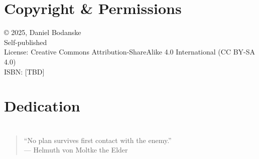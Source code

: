 \cleardoublepage
\chapter*{Copyright \& Permissions}
© 2025, Daniel Bodanske\\
Self-published\\
License: Creative Commons Attribution-ShareAlike 4.0 International (CC BY-SA 4.0)\\
ISBN: [TBD]
\clearpage

\cleardoublepage
\chapter*{Dedication}
\clearpage

\cleardoublepage
\chapter*{}
\begin{quote}
  “No plan survives first contact with the enemy.”\\
  \hfill— Helmuth von Moltke the Elder
\end{quote}
\clearpage